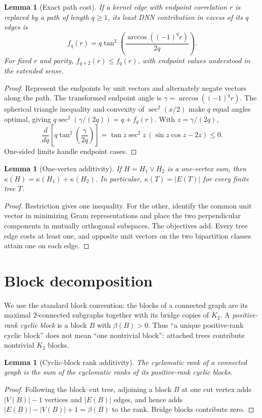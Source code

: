 \documentclass[11pt]{article}
\newtheorem{lemma}[theorem]{Lemma}
\theoremstyle{definition}
\theoremstyle{remark}
\newcommand{\betarank}{\beta}
\begin{document}
\begin{lemma}[Exact path cost]\label{lem:path}
If a kernel edge with endpoint correlation $r$ is replaced by a path of length
$q\ge1$, its least DNN contribution in excess of its $q$ edges is
\[
 f_q(r)=q\tan^2\!\left(
 \frac{\arccos((-1)^q r)}{2q}\right).
\]
For fixed $r$ and parity, $f_{q+2}(r)\le f_q(r)$, with endpoint values
understood in the extended sense.
\end{lemma}
\begin{proof}
Represent the endpoints by unit vectors and alternately negate vectors along
the path.  The transformed endpoint angle is
$\gamma=\arccos((-1)^q r)$.  The spherical triangle inequality and convexity
of $\sec^2(x/2)$ make $q$ equal angles optimal, giving
$q\sec^2(\gamma/(2q))=q+f_q(r)$.  With $z=\gamma/(2q)$,
\[
 \frac{d}{dq}\left[q\tan^2\!\left(\frac\gamma{2q}\right)\right]
 =\tan z\sec^2z\,(\sin z\cos z-2z)\le0.
\]
One-sided limits handle endpoint cases.
\end{proof}

\begin{lemma}[One-vertex additivity]\label{lem:additivity}
If $H=H_1\vee H_2$ is a one-vertex sum, then
$\kappa(H)=\kappa(H_1)+\kappa(H_2)$.  In particular,
$\kappa(T)=|E(T)|$ for every finite tree $T$.
\end{lemma}
\begin{proof}
Restriction gives one inequality.  For the other, identify the common unit
vector in minimizing Gram representations and place the two perpendicular
components in mutually orthogonal subspaces.  The objectives add.  Every tree
edge costs at least one, and opposite unit vectors on the two bipartition
classes attain one on each edge.
\end{proof}

\section{Block decomposition}

We use the standard block convention: the blocks of a connected graph are its
maximal $2$-connected subgraphs together with its bridge copies of $K_2$.  A
\emph{positive-rank cyclic block} is a block $B$ with $\betarank(B)>0$.
Thus ``a unique positive-rank cyclic block'' does not mean ``one nontrivial
block'': attached trees contribute nontrivial $K_2$ blocks.

\begin{lemma}[Cyclic-block rank additivity]\label{lem:block-rank}
The cyclomatic rank of a connected graph is the sum of the cyclomatic ranks of
its positive-rank cyclic blocks.
\end{lemma}
\begin{proof}
Following the block--cut tree, adjoining a block $B$ at one cut vertex adds
$|V(B)|-1$ vertices and $|E(B)|$ edges, and hence adds
$|E(B)|-|V(B)|+1=\betarank(B)$ to the rank.  Bridge blocks contribute zero.
\end{proof}
\end{document}
